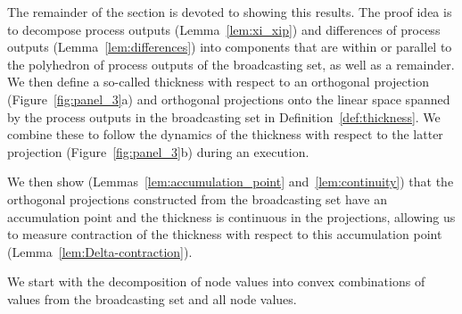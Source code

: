 \documentclass[a4paper,USenglish]{lipics-v2021}
\begin{document}
The remainder of the section is devoted to showing this results.
The proof idea is to decompose process outputs (Lemma~\ref{lem:xi_xip}) and differences of process outputs (Lemma~\ref{lem:differences}) into components that are within or parallel to the polyhedron of process outputs of the broadcasting set, as well as a remainder.
We then define a so-called thickness with respect to an orthogonal projection (Figure~\ref{fig:panel_3}a) and orthogonal projections onto the linear space spanned by the process outputs in the broadcasting set in Definition~\ref{def:thickness}.
We combine these to follow the dynamics of the thickness with respect to the latter projection (Figure~\ref{fig:panel_3}b) during an execution.

We then show (Lemmas~\ref{lem:accumulation_point} and~\ref{lem:continuity}) that the orthogonal projections constructed from the broadcasting set have an accumulation point and the thickness is continuous in the projections, allowing us to measure contraction of the thickness with respect to this accumulation point (Lemma~\ref{lem:Delta-contraction}).

We start with the decomposition of node values into convex combinations of values from the broadcasting set
and all node values.
\end{document}
